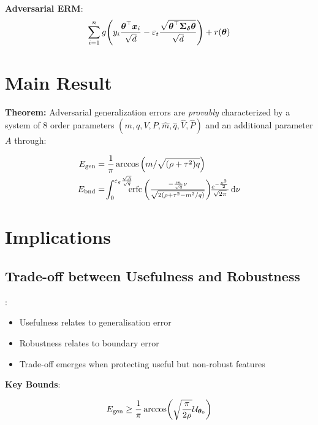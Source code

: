 \documentclass[a0paper,fleqn]{betterportraitposter}
\theoremstyle{plain}
\theoremstyle{definition}
\theoremstyle{remark}
\begin{document}
{\begin{multicols}{3}
\textbf{Adversarial ERM}:
\begin{equation}
    \sum_{i = 1}^{n} 
    g \qty(
        y_{i} \frac{\boldsymbol{\theta}^\top \boldsymbol{x}_{i}}{\sqrt{d}} 
        - \varepsilon_t \frac{\sqrt{\boldsymbol{\theta}^\top \boldsymbol{\Sigma}_{\boldsymbol{\delta}} \boldsymbol{\theta}}}{\sqrt{d}} 
    ) 
    + r(\boldsymbol{\theta})
\end{equation}

\section{Main Result}

\textbf{Theorem:} Adversarial generalization errors are \textit{provably} characterized by a system of 8 order parameters $(m, q, V, P, \hat{m}, \hat{q}, \hat{V}, \hat{P})$ and an additional parameter \(A\) through:

\begin{align}
    E_{\mathrm{gen}} &= \frac{1}{\pi} \arccos \qty( 
    {
        m / \sqrt{ (\rho + \tau^2) q}
    } 
    ) \\
    E_{\mathrm{bnd}} &= \!
    \int_{0}^{\varepsilon_g \frac{\sqrt{A}}{\sqrt{q}}} \!\!\!\!
    {\textstyle
        \operatorname*{erfc}\left( \frac{ -\frac{m}{\sqrt{q}} \nu}{\sqrt{2 \qty(\rho + \tau^2 - m^2 / q)}} \right) 
        \!\! \frac{e^{-\frac{\nu^2}{2}}}{\sqrt{2\pi}} \dd{\nu}
    }
    \label{eq:adv-error-theorem-overlap}
\end{align}

\section{Implications}

\subsection{Trade-off between Usefulness and Robustness}:

\begin{itemize}
    \item Usefulness relates to generalisation error
    \item Robustness relates to boundary error
    \item Trade-off emerges when protecting useful but non-robust features
\end{itemize}

\textbf{Key Bounds}:

\begin{equation}
    E_{\mathrm{gen}}
    \geq
    \frac{1}{\pi} \arccos( \sqrt{\frac{\pi}{2 \rho}} \mathcal{U}_{\boldsymbol{\theta}_0} )
    \label{eq:bound-gen-error}
\end{equation}


\end{multicols}}
\end{document}
